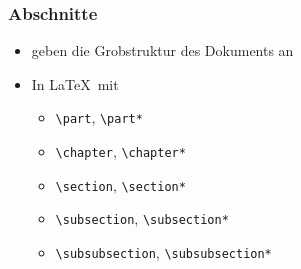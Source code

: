 
\subtitle{Abschnitte, Tabellen und Bilder}
\date{2017-05-16}



\begin{frame}[fragile]
  \frametitle{Abschnitte}

  \begin{itemize}
    \item<+-> geben die Grobstruktur des Dokuments an
    \item<+-> In \LaTeX\ mit
      \begin{itemize}
        \item \lstinline!\part!, \lstinline!\part*!
        \item \lstinline!\chapter!, \lstinline!\chapter*!
        \item \lstinline!\section!, \lstinline!\section*!
        \item \lstinline!\subsection!, \lstinline!\subsection*!
        \item \lstinline!\subsubsection!, \lstinline!\subsubsection*!

\end{itemize}
\end{itemize}
\end{frame}
